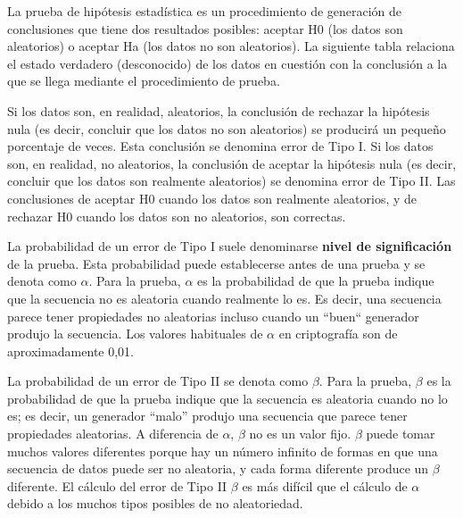 	La prueba de hipótesis estadística es un procedimiento de generación de conclusiones que tiene dos resultados posibles: aceptar H0 (los datos son aleatorios) o aceptar Ha (los datos no son aleatorios). La siguiente tabla relaciona el estado verdadero (desconocido) de los datos en cuestión con la conclusión a la que se llega mediante el procedimiento de prueba.
	


\begin{table}[htbp]
\centering
\caption{Tipos de errores.}
\label{tab:asd}%
\end{table}


Si los datos son, en realidad, aleatorios, la conclusión de rechazar la hipótesis nula (es decir, concluir que los datos no son aleatorios) se producirá un pequeño porcentaje de veces. Esta conclusión se denomina error de Tipo I. Si los datos son, en realidad, no aleatorios, la conclusión de aceptar la hipótesis nula (es decir, concluir que los datos son realmente aleatorios) se denomina error de Tipo II. Las conclusiones de aceptar H0 cuando los datos son realmente aleatorios, y de rechazar H0 cuando los datos son no aleatorios, son correctas.


La probabilidad de un error de Tipo I suele denominarse \textbf{nivel de significación} de la prueba. Esta probabilidad puede establecerse antes de una prueba y se denota como $\alpha$. Para la prueba, $\alpha$ es la probabilidad de que la prueba indique que la secuencia no es aleatoria cuando realmente lo es. Es decir, una secuencia parece tener propiedades no aleatorias incluso cuando un ``buen`` generador produjo la secuencia. Los valores habituales de $\alpha$ en criptografía son de aproximadamente 0,01.

La probabilidad de un error de Tipo II se denota como $\beta$. Para la prueba, $\beta$ es la probabilidad de que la prueba indique que la secuencia es aleatoria cuando no lo es; es decir, un generador ``malo'' produjo una secuencia que parece tener propiedades aleatorias. A diferencia de $\alpha$, $\beta$ no es un valor fijo. $\beta$ puede tomar muchos valores diferentes porque hay un número infinito de formas en que una secuencia de datos puede ser no aleatoria, y cada forma diferente produce un $\beta$ diferente. El cálculo del error de Tipo II $\beta$ es más difícil que el cálculo de $\alpha$ debido a los muchos tipos posibles de no aleatoriedad.

